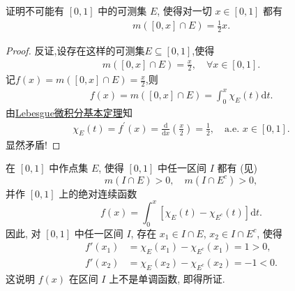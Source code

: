 \documentclass[../../main.tex]{subfiles}%
\begin{document}
\begin{example}
证明不可能有 $[0,1]$ 中的可测集 $E$, 使得对一切 $x\in[0,1]$ 都有
\begin{align*}
m([0,x]\cap E)=\frac{1}{2}x.
\end{align*}
\end{example}
\begin{proof}

反证,设存在这样的可测集$E\subseteq [0,1]$,使得
\begin{align*}
m\left( [0,x] \cap E \right) =\frac{x}{2},\quad \forall x\in [0,1].
\end{align*}
记$f\left( x \right) =m\left( [0,x] \cap E \right) =\frac{x}{2}$,则
\begin{align*}
f\left( x \right) =m\left( [0,x] \cap E \right) =\int_0^x{\chi _E\left( t \right) \mathrm{d}t}.
\end{align*}
由\hyperref[corollary:Lebesgue微积分基本定理]{Lebesgue微积分基本定理}知
\begin{align*}
\chi _E\left( t \right) =f^\prime \left( x \right) =\frac{\mathrm{d}}{\mathrm{d}x}\left( \frac{x}{2} \right) =\frac{1}{2},\quad \mathrm{a}.\mathrm{e}.\,\,x\in [0,1].
\end{align*}
显然矛盾!

\end{proof}

\begin{example}[无处单调的绝对连续函数]
在 $[0,1]$ 中作点集 $E$, 使得 $[0,1]$ 中任一区间 $I$ 都有 (见)
\[
m(I\cap E) > 0,\quad m(I\cap E^c) > 0,
\]
并作 $[0,1]$ 上的绝对连续函数
\[
f(x) = \int_0^x [\chi_E(t) - \chi_{E^c}(t)]\mathrm{d}t.
\]
因此, 对 $[0,1]$ 中任一区间 $I$, 存在 $x_1\in I\cap E$, $x_2\in I\cap E^c$, 使得
\begin{align*}
f'(x_1) &= \chi_E(x_1) - \chi_{E^c}(x_1) = 1 > 0, \\
f'(x_2) &= \chi_E(x_2) - \chi_{E^c}(x_2) = -1 < 0.
\end{align*}
这说明 $f(x)$ 在区间 $I$ 上不是单调函数, 即得所证.
\end{example}
\end{document}
